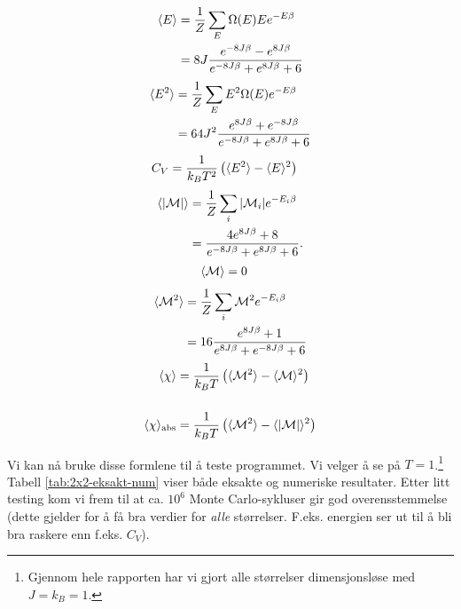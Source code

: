 \documentclass[11pt]{article}
\begin{document}
\begin{align}
\begin{split}
  \langle E \rangle &= \frac{ 1 }{ Z }\sum_E \Omega(E) E e^{-E\beta}\\
           &= 8J \frac{ e^{-8J\beta}  - e^{8J\beta}}{ e^{-8J\beta}
             + e^{8J\beta} + 6}\label{eq:mean-E-2x2}
\end{split}
\end{align}
\begin{align}
\begin{split}
  \langle E^2 \rangle &= \frac{ 1 }{ Z }\sum_E E^2\Omega(E)e^{-E\beta}\\
  &= 64J^2 \frac{ e^{8J\beta} + e^{-8J\beta} }{ e^{-8J\beta} +
    e^{8J\beta} + 6 }\label{eq:mean-E2-2x2}
\end{split}
\end{align}
\begin{align}
  C_V &= \frac{ 1}{k_BT^2} \left( \langle E^2 \rangle - \langle E \rangle^2
        \right)\label{eq:mean-C-2x2}
\end{align}
\begin{align}
\begin{split}
  \langle |\mathcal{M}| \rangle &= \frac{ 1 }{ Z }\sum_i |\mathcal{M}_i| e^{-E_i\beta}\\
  &= \frac{ 4e^{8J\beta} + 8  }{ e^{-8J\beta} + e^{8J\beta} + 6 }.\label{eq:mean-abs-M-2x2}
\end{split}
\end{align}
\begin{align}
\langle \mathcal{M} \rangle &= 0\label{eq:mean-M-2x2}
\end{align}
\begin{align}
\begin{split}
  \langle \mathcal{M}^2 \rangle &= \frac{ 1 }{ Z } \sum_i \mathcal{M}^2
  e^{-E_i\beta}\\
  &= 16 \frac{ e^{8J\beta} + 1 }{ e^{8J\beta} + e^{-8J\beta}+6 }\label{eq:mean-M2-2x2}
\end{split}
\end{align}
\begin{align}
\langle \chi \rangle &= \frac{ 1 }{ k_B T} \left(
              \langle \mathcal{M}^2 \rangle-\langle \mathcal{M} \rangle^2
              \right)\label{eq:mean-chi-2x2}\\[0.5cm]
\langle \chi \rangle_\text{abs} &= \frac{ 1 }{ k_B T} \left( \langle \mathcal{M}^2 \rangle-\langle \mathcal{|M|} \rangle^2 \right)\label{eq:mean-chi-2x2-abs}
\end{align}

Vi kan nå bruke disse formlene til å teste programmet. Vi velger å se
på $T=1$.\footnote{Gjennom hele rapporten har vi gjort alle
  størrelser dimensjonsløse med $J=k_B=1$.} Tabell \ref{tab:2x2-eksakt-num} viser både eksakte og
numeriske resultater. Etter litt testing kom vi frem til at ca. $10^6$
Monte Carlo-sykluser gir god overensstemmelse (dette gjelder for å få
bra verdier for \textit{alle} størrelser. F.eks. energien ser ut til å bli bra
raskere enn f.eks. $C_V$).
\end{document}
